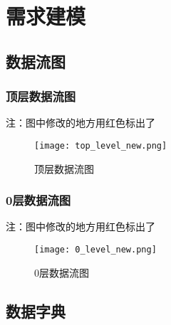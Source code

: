 \chapter{\color{red} 需求建模}
\begin{landscape}
    \section{\color{red} 数据流图}
    
        \subsection{\color{red} 顶层数据流图}
        注：图中修改的地方用红色标出了
        \begin{figure}[ht]
            \centering
            \texttt{[image: top\_level\_new.png]}\label{tab:classification}
            \caption{\color{red} 顶层数据流图}\label{fig:noted-figure}
        \end{figure}
    \end{landscape}
        \newpage
    \begin{landscape}
        \subsection{\color{red} 0层数据流图}
        注：图中修改的地方用红色标出了
        \begin{figure}[ht]
            \centering
            \texttt{[image: 0\_level\_new.png]}\label{tab:classification}
            \caption{\color{red} 0层数据流图}\label{fig:noted-figure}
        \end{figure}
    \end{landscape}
        \newpage
    \section{\color{red} 数据字典}


